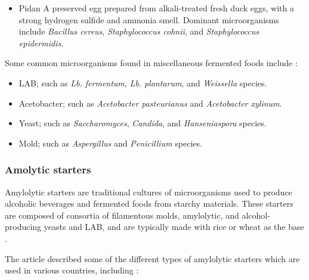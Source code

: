 \begin{highlight}
    \begin{itemize}
        \item Pidan
        \subitem A preserved egg prepared from alkali-treated fresh duck eggs, with a strong hydrogen 
        \subitem sulfide and ammonia smell.
        \subitem Dominant microorganisms include \textit{Bacillus cereus}, \textit{Staphylococcus cohnii}, and \textit{Staphylococcus}
        \subitem \textit{epidermidis}.
    \end{itemize}    
\end{highlight}

Some common microorganisms found in miscellaneous fermented foods include \cite*{L1-DiversityMicro}:

\begin{highlight}
    \begin{itemize}
        \item LAB; such as \textit{Lb. fermentum}, \textit{Lb. plantarum}, and \textit{Weissella} species.
        \item Acetobacter; such as \textit{Acetobacter pasteurianus} and \textit{Acetobacter xylinum}.
        \item Yeast; such as \textit{Saccharomyces}, \textit{Candida}, and \textit{Hanseniaspora} species.
        \item Mold; such as \textit{Aspergillus} and \textit{Penicillium} species.
    \end{itemize}
\end{highlight}

\subsubsection*{Amolytic starters}
Amylolytic starters are traditional cultures of microorganisms used to produce alcoholic beverages and fermented foods from starchy materials. These starters are composed of consortia of filamentous molds, amylolytic, and alcohol-producing yeasts and LAB, and are typically made with rice or wheat as the base \cite*{L1-DiversityMicro}.


The article described some of the different types of amylolytic starters which are used in various countries, including \cite*{L1-DiversityMicro}:

